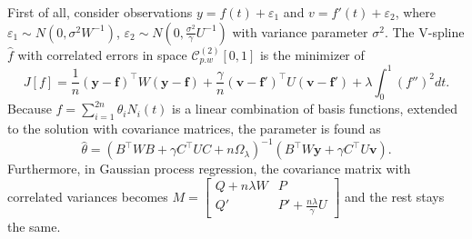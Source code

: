 First of all, consider observations $y=f(t)+\varepsilon_1$ and $v=f'(t)+\varepsilon_2$, where $\varepsilon_1\sim N\left(0,\sigma^2W^{-1}\right)$, $\varepsilon_2\sim N\left(0,\frac{\sigma^2}{\gamma}U^{-1}\right)$ with variance parameter $\sigma^2$. The V-spline $\hat{f}$ with correlated errors in space $\mathcal{C}_{p.w}^{(2)}[0,1]$ is the minimizer of 
\begin{equation}
J[f]=\frac{1}{n}\left(\mathbf{y}-\mathbf{f}\right)^\top W\left(\mathbf{y}-\mathbf{f}\right)+\frac{\gamma}{n}\left(\mathbf{v}-\mathbf{f}'\right)^\top U\left(\mathbf{v}-\mathbf{f}'\right)+\lambda\int_0^1\left(f''\right)^2dt.
\end{equation}
Because $f=\sum_{i=1}^{2n}\theta_iN_i\left(t\right)$ is a linear combination of basis functions, extended to the solution with covariance matrices, the parameter is found as  
\begin{equation}
\hat{\theta}=\left(B^\top W B+ \gamma C^\top UC+n\Omega_\lambda\right)^{-1}\left(B^\top W \mathbf{y}+\gamma C^\top U\mathbf{v}\right).
\end{equation}
Furthermore, in Gaussian process regression, the covariance matrix with correlated variances becomes 
$M=\begin{bmatrix}
Q+n\lambda W& P\\
Q'& P'+\frac{n\lambda}{\gamma}U
\end{bmatrix}$ and the rest stays the same. 


